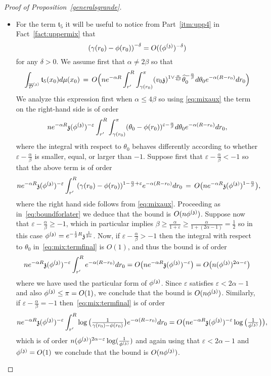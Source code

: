 \begin{proof}[Proof of Proposition~\ref{generalsgrande}]
\begin{itemize}
\item For the term $\mathfrak{t}_5$ it will be useful to notice from Part~\ref{itm:upp4} in Fact~\ref{fact:uppermix} that \begin{equation}\label{eq:mixaux}\left(\gamma(r_0)-\phi(r_0)\right)^{-\delta}=O((\phi^{(\mathfrak{z})})^{-\delta})\end{equation} for any $\delta>0$. We assume first that $\alpha\neq2\beta$ so that
\begin{equation}\label{eq:lastterm}\int_{\overline{\mathcal{D}}^{(\mathfrak{z})}}\mathfrak{t}_5(x_0)d\mu(x_0)\,=\,O\Big(ne^{-\alpha R}\int_{r'}^R\int_{\gamma(r_0)}^\pi (v_0\mathfrak{z})^{1\vee\frac{\alpha}{4\beta}}\widehat{\theta}_0^{-\frac{\alpha}{\beta}}d\theta_0e^{-\alpha(R-r_0)}dr_0\Big)\end{equation}
We analyze this expression first when $\alpha\leq 4\beta$ so using \eqref{eq:mixaux} the term on the right-hand side is of order
\begin{equation}\label{eq:mix:termfinal}ne^{-\alpha R}\mathfrak{z}(\phi^{(\mathfrak{z})})^{-\varepsilon}\int_{r'}^R\int_{\gamma(r_0)}^\pi (\theta_0-\phi(r_0))^{\varepsilon-\frac{\alpha}{\beta}}d\theta_0e^{-\alpha(R-r_0)}dr_0,\end{equation}
where the integral with respect to $\theta_0$ behaves differently according to whether $\varepsilon-\frac{\alpha}{\beta}$ is smaller, equal, or larger than ${-}1$. Suppose first that $\varepsilon-\frac{\alpha}{\beta}<{-}1$ so that the above term is of order
\[ne^{-\alpha R}\mathfrak{z}(\phi^{(\mathfrak{z})})^{-\varepsilon}\int_{r'}^R (\gamma(r_0)-\phi(r_0))^{1-\frac{\alpha}{\beta}+\varepsilon}e^{-\alpha(R-r_0)}dr_0\,=\,O\big(ne^{-\alpha R}\mathfrak{z}(\phi^{(\mathfrak{z})})^{1-\frac{\alpha}{\beta}}\big),\]
where the right hand side follows from \eqref{eq:mixaux}. Proceeding as in~\eqref{eq:boundforlater} we deduce that the bound is $O(n\phi^{(\mathfrak{z})})$. Suppose now that $\varepsilon-\frac{\alpha}{\beta}\geq-1$, which in particular implies $\beta\geq\frac{\alpha}{1+\varepsilon}\geq\frac{\alpha}{1+(2\alpha-1)}=\frac{1}{2}$ so in this case $\phi^{(\mathfrak{z})}=e^{-\frac12 R}\mathfrak{z}^{\frac{1}{2\alpha}}$. Now, if $\varepsilon-\frac{\alpha}{\beta}>-1$ then the integral with respect to $\theta_0$ in~\eqref{eq:mix:termfinal} is $O(1)$, and thus the bound is of order
\[ne^{-\alpha R}\mathfrak{z}(\phi^{(\mathfrak{z})})^{-\varepsilon}\int_{r'}^Re^{-\alpha(R-r_0)}dr_0=O\big(ne^{-\alpha R}\mathfrak{z}(\phi^{(\mathfrak{z})})^{-\varepsilon}\big)=O\big(n(\phi^{(\mathfrak{z})})^{2\alpha-\varepsilon}\big)\]
where we have used the particular form of $\phi^{(\mathfrak{z})}$. Since $\varepsilon$ satisfies $\varepsilon<2\alpha-1$ and also $\phi^{(\mathfrak{z})}\le\pi=O(1)$, we conclude that the bound is $O(n\phi^{(\mathfrak{z})})$. Similarly, if $\varepsilon-\frac{\alpha}{\beta}=-1$ then~\eqref{eq:mix:termfinal} is of order 
\[ne^{-\alpha R}\mathfrak{z}(\phi^{(\mathfrak{z})})^{-\varepsilon}\int_{r'}^R\log\big(\tfrac{1}{\gamma(r_0)-\phi(r_0)}\big)e^{-\alpha(R-r_0)}dr_0=O\big(ne^{-\alpha R}\mathfrak{z}(\phi^{(\mathfrak{z})})^{-\varepsilon}\log\big(\tfrac{1}{\phi^{(\mathfrak{z})}}\big)\big),\]
which is of order $n(\phi^{(\mathfrak{z})})^{2\alpha-\varepsilon}\log(\frac{1}{\phi^{(\mathfrak{z})}})$ and again using that $\varepsilon<2\alpha-1$ and $\phi^{(\mathfrak{z})}=O(1)$ we conclude that the bound is $O(n\phi^{(\mathfrak{z})})$.


\end{itemize}
\end{proof}
